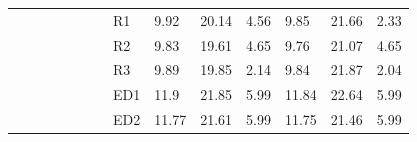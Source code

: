 {\begin{minipage}{\linewidth}
\begin{tabular}{l|l|l|l|c|c|r|l|lll|lll}
                                              &                                          &                                           &                                           & \multicolumn{1}{l|}{}                      &                                                                                         & \multicolumn{1}{c|}{}                                                                          & R1                                        & 9.92  & 20.14 & 4.56      & 9.85  & 21.66 & 2.33       \\
                                              &                                          &                                           &                                           & \multicolumn{1}{l|}{}                      &                                                                                         & \multicolumn{1}{c|}{}                                                                          & R2                                        & 9.83  & 19.61 & 4.65      & 9.76  & 21.07 & 4.65       \\
                                              &                                          &                                           &                                           & \multicolumn{1}{l|}{}                      &                                                                                         & \multicolumn{1}{c|}{}                                                                          & R3                                        & 9.89  & 19.85 & 2.14      & 9.84  & 21.87 & 2.04       \\
                                              &                                          &                                           &                                           & \multicolumn{1}{l|}{}                      &                                                                                         & \multicolumn{1}{c|}{}                                                                          & ED1                                       & 11.9  & 21.85 & 5.99      & 11.84 & 22.64 & 5.99       \\
                                              &                                          &                                           &                                           & \multicolumn{1}{l|}{}                      &                                                                                         & \multicolumn{1}{c|}{}                                                                          & ED2                                       & 11.77 & 21.61 & 5.99      & 11.75 & 21.46 & 5.99       \\

\end{tabular}
\end{minipage}}
